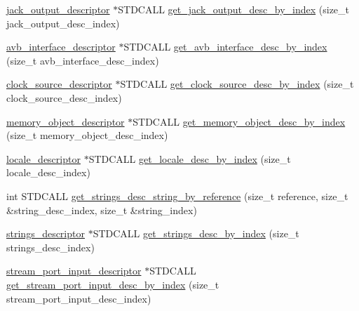 \begin{DoxyCompactItemize}
\item 
\hyperlink{classavdecc__lib_1_1jack__output__descriptor}{jack\+\_\+output\+\_\+descriptor} $\ast$S\+T\+D\+C\+A\+LL \hyperlink{classavdecc__lib_1_1configuration__descriptor__imp_a0da43b8a1356e1f2b368e431984ef5c4}{get\+\_\+jack\+\_\+output\+\_\+desc\+\_\+by\+\_\+index} (size\+\_\+t jack\+\_\+output\+\_\+desc\+\_\+index)
\item 
\hyperlink{classavdecc__lib_1_1avb__interface__descriptor}{avb\+\_\+interface\+\_\+descriptor} $\ast$S\+T\+D\+C\+A\+LL \hyperlink{classavdecc__lib_1_1configuration__descriptor__imp_a034001c3d6ad271fffaace42ccf3262c}{get\+\_\+avb\+\_\+interface\+\_\+desc\+\_\+by\+\_\+index} (size\+\_\+t avb\+\_\+interface\+\_\+desc\+\_\+index)
\item 
\hyperlink{classavdecc__lib_1_1clock__source__descriptor}{clock\+\_\+source\+\_\+descriptor} $\ast$S\+T\+D\+C\+A\+LL \hyperlink{classavdecc__lib_1_1configuration__descriptor__imp_a8059b026d40756616562c711056a97d1}{get\+\_\+clock\+\_\+source\+\_\+desc\+\_\+by\+\_\+index} (size\+\_\+t clock\+\_\+source\+\_\+desc\+\_\+index)
\item 
\hyperlink{classavdecc__lib_1_1memory__object__descriptor}{memory\+\_\+object\+\_\+descriptor} $\ast$S\+T\+D\+C\+A\+LL \hyperlink{classavdecc__lib_1_1configuration__descriptor__imp_acc0b9cada86c734c0da3d99e08834d7b}{get\+\_\+memory\+\_\+object\+\_\+desc\+\_\+by\+\_\+index} (size\+\_\+t memory\+\_\+object\+\_\+desc\+\_\+index)
\item 
\hyperlink{classavdecc__lib_1_1locale__descriptor}{locale\+\_\+descriptor} $\ast$S\+T\+D\+C\+A\+LL \hyperlink{classavdecc__lib_1_1configuration__descriptor__imp_a9f376d3315afd085e547f25326662812}{get\+\_\+locale\+\_\+desc\+\_\+by\+\_\+index} (size\+\_\+t locale\+\_\+desc\+\_\+index)
\item 
int S\+T\+D\+C\+A\+LL \hyperlink{classavdecc__lib_1_1configuration__descriptor__imp_a0dfa8ae59687578b48b9310c337a1f13}{get\+\_\+strings\+\_\+desc\+\_\+string\+\_\+by\+\_\+reference} (size\+\_\+t reference, size\+\_\+t \&string\+\_\+desc\+\_\+index, size\+\_\+t \&string\+\_\+index)
\item 
\hyperlink{classavdecc__lib_1_1strings__descriptor}{strings\+\_\+descriptor} $\ast$S\+T\+D\+C\+A\+LL \hyperlink{classavdecc__lib_1_1configuration__descriptor__imp_a61225c4845898e23fc6d292ce6bd66b8}{get\+\_\+strings\+\_\+desc\+\_\+by\+\_\+index} (size\+\_\+t strings\+\_\+desc\+\_\+index)
\item 
\hyperlink{classavdecc__lib_1_1stream__port__input__descriptor}{stream\+\_\+port\+\_\+input\+\_\+descriptor} $\ast$S\+T\+D\+C\+A\+LL \hyperlink{classavdecc__lib_1_1configuration__descriptor__imp_abe61ea543e9782fa37396d586d75415b}{get\+\_\+stream\+\_\+port\+\_\+input\+\_\+desc\+\_\+by\+\_\+index} (size\+\_\+t stream\+\_\+port\+\_\+input\+\_\+desc\+\_\+index)

\end{DoxyCompactItemize}
